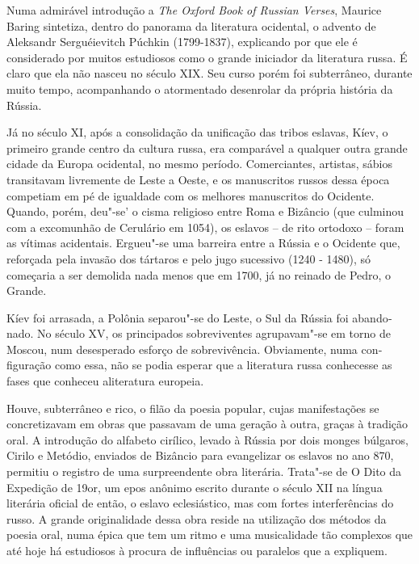 Numa admirável introdução a \emph{The Oxford Book of Russian Verses},
Maurice Baring sintetiza, dentro do panorama da literatura ocidental, o
advento de Aleksandr Serguéievitch Púchkin (1799-1837), explicando por
que ele é considerado por muitos estudiosos como o grande iniciador da
literatura russa. É claro que ela não nasceu no século XIX. Seu curso
porém foi subterrâneo, durante muito tempo, acompanhando o atormentado
desenrolar da própria história da Rússia.

Já no século XI, após a consolidação da unificação das tribos eslavas,
Kíev, o primeiro grande centro da cultura russa, era comparável a
qualquer outra grande cidade da Europa ocidental, no mesmo período.
Comerciantes, artistas, sábios transitavam livremente de Leste a Oeste,
e os manuscritos russos dessa época competiam em pé de igualdade com os
melhores manuscritos do Ocidente. Quando, porém, deu"-se' o cisma
religioso entre Roma e Bizâncio (que culmi­nou com a excomunhão de
Cerulário em 1054), os eslavos -- de rito ortodoxo -- foram as vítimas
acidentais. Ergueu"-se uma barreira entre a Rússia e o Ociden­te que,
reforçada pela invasão dos tártaros e pelo jugo sucessivo (1240 - 1480),
só começaria a ser demolida nada menos que em 1700, já no reinado de
Pedro, o Grande.

Kíev foi arrasada, a Polônia separou"-se do Leste, o Sul da Rússia foi
abando­nado. No século XV, os principados sobreviventes agrupavam"-se em
torno de Moscou, num desesperado esforço de sobrevivência. Obviamente,
numa con­figuração como essa, não se podia esperar que a literatura
russa conhecesse as fases que conheceu aliteratura europeia.

Houve, subterrâneo e rico, o filão da poesia popular, cujas
manifestações se concretizavam em obras que passavam de uma geração à
outra, graças à tradi­ção oral. A introdução do alfabeto cirílico,
levado à Rússia por dois monges búlgaros, Cirilo e Metódio, enviados de
Bizâncio para evangelizar os eslavos no ano 870, permitiu o registro de
uma surpreendente obra literária. Trata"-se de O Dito da Expedição de
19or, um epos anônimo escrito durante o século XII na língua literária
oficial de então, o eslavo eclesiástico, mas com fortes interfe­rências
do russo. A grande originalidade dessa obra reside na utilização dos
métodos da poesia oral, numa épica que tem um ritmo e uma musicalidade
tão complexos que até hoje há estudiosos à procura de influências ou
paralelos que a expliquem.

